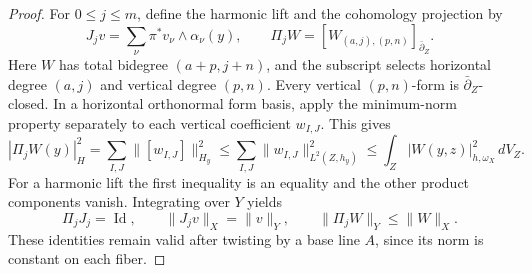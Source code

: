 \documentclass[11pt,reqno]{amsart}
\numberwithin{equation}{section}
\theoremstyle{definition}
\theoremstyle{remark}
\newcommand{\Id}{\operatorname{Id}}
\begin{document}
\begin{proof}
For $0\le j\le m$, define the harmonic lift and the cohomology
projection by
\[
 J_jv=\sum_\nu\pi^*v_\nu\wedge\alpha_\nu(y),\qquad
 \Pi_jW=[W_{(a,j),(p,n)}]_{\bar\partial_Z}.
\]
Here $W$ has total bidegree $(a+p,j+n)$, and the subscript selects
horizontal degree $(a,j)$ and vertical degree $(p,n)$.
Every vertical $(p,n)$-form is $\bar\partial_Z$-closed.  In a
horizontal orthonormal form basis, apply the minimum-norm property
separately to each vertical coefficient $w_{I,J}$.  This gives
\[
 |\Pi_jW(y)|_H^2
   =\sum_{I,J}\|[w_{I,J}]\|_{H_y}^2
   \le\sum_{I,J}\|w_{I,J}\|_{L^2(Z,h_y)}^2
   \le\int_Z|W(y,z)|_{h,\omega_X}^2\,dV_Z .
\]
For a harmonic lift the first inequality is an equality and the
other product components vanish.  Integrating over $Y$ yields
\begin{equation}\label{eq:top-projection}
 \Pi_jJ_j=\Id,\qquad \|J_jv\|_X=\|v\|_Y,\qquad
 \|\Pi_jW\|_Y\le\|W\|_X.
\end{equation}
These identities remain valid after twisting by a base line $A$,
since its norm is constant on each fiber.


\end{proof}
\end{document}
